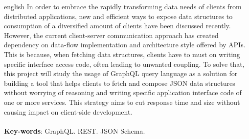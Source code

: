 \begin{resumo}[Abstract]
  \begin{otherlanguage*}{english}
    In order to embrace the rapidly transforming data needs of clients from distributed applications, new and efficient ways to expose data structures to consumption of a diversified amount of clients have been discussed recently. However, the current client-server communication approach has created dependency on data-flow implementation and architecture style offered by APIs. This is because, when fetching data structures, clients have to must on writing specific interface access code, often leading to unwanted coupling. To solve that, this project will study the usage of GraphQL query language as a solution for building a tool that helps clients to fetch and compose JSON data structures without worrying of reasoning and writing specific application interface code of one or more services. This strategy aims to cut response time and size without causing impact on client-side development. \\ \\
    \textbf{Key-words}: GraphQL. REST. JSON Schema.
  \end{otherlanguage*}
\end{resumo}